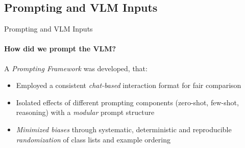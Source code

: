 \subsection{Prompting and VLM Inputs}
\begin{frame}{Prompting and VLM Inputs}
\framesubtitle{How did we prompt the VLM?}
  \vspace{-1em}
  A \emph{Prompting Framework} was developed, that:
  \begin{itemize}
    \item Employed a consistent \emph{chat-based} interaction format for fair comparison
    \item Isolated effects of different prompting components (zero-shot, few-shot, reasoning) with a \emph{modular} prompt structure
    \item \emph{Minimized biases} through systematic, deterministic and reproducible \emph{randomization} of class lists and example ordering
  \end{itemize}
\end{frame}


